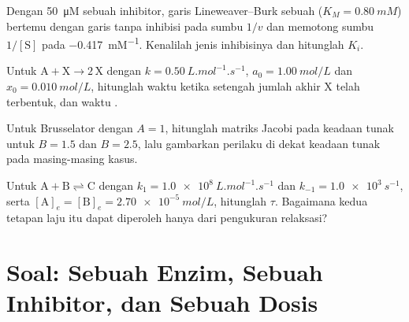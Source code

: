 \begin{exercise}[$\star\star$]\label{exo:b3:complex-kinetics:9}
Dengan \qty{50}{\micro M} sebuah inhibitor, garis Lineweaver--Burk sebuah 
($K_M = \qty{0.80}{mM}$) bertemu dengan garis tanpa inhibisi pada sumbu $1/v$
dan memotong sumbu $1/[\mathrm S]$ pada \qty{-0.417}{mM^{-1}}. Kenalilah jenis
inhibisinya dan hitunglah $K_i$.
\end{exercise}

\begin{exercise}[$\star\star\star$]\label{exo:b3:complex-kinetics:10}
Untuk $\mathrm{A + X \to 2\,X}$ dengan $k = \qty{0.50}{L.mol^{-1}.s^{-1}}$, $a_0 = \qty{1.00}{mol/L}$
dan $x_0 = \qty{0.010}{mol/L}$, hitunglah waktu ketika setengah jumlah akhir X
telah terbentuk, dan waktu .
\end{exercise}

\begin{exercise}[$\star\star\star$]\label{exo:b3:complex-kinetics:11}
Untuk Brusselator dengan $A = 1$, hitunglah  matriks Jacobi pada
keadaan tunak untuk $B = 1.5$ dan $B = 2.5$, lalu gambarkan perilaku di dekat
keadaan tunak pada masing-masing kasus.
\end{exercise}

\begin{exercise}[$\star\star\star$]\label{exo:b3:complex-kinetics:12}
Untuk $\mathrm{A + B \rightleftharpoons C}$ dengan $k_1 = \qty{1.0e8}{L.mol^{-1}.s^{-1}}$ dan
$k_{-1} = \qty{1.0e3}{s^{-1}}$, serta $[\mathrm A]_e = [\mathrm B]_e = \qty{2.70e-5}{mol/L}$,
hitunglah $\tau$. Bagaimana kedua tetapan laju itu dapat diperoleh hanya dari
pengukuran relaksasi?
\end{exercise}

\section{Soal: Sebuah Enzim, Sebuah Inhibitor, dan Sebuah Dosis}


